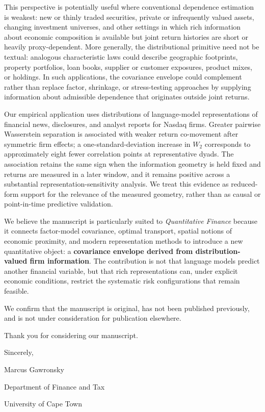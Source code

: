 \documentclass[11pt]{article}
\begin{document}
This perspective is potentially useful where conventional dependence
estimation is weakest: new or thinly traded securities, private or
infrequently valued assets, changing investment universes, and other settings
in which rich information about economic composition is available but joint
return histories are short or heavily proxy-dependent.
More generally, the distributional primitive need not be textual: analogous
characteristic laws could describe geographic footprints, property
portfolios, loan books, supplier or customer exposures, product mixes, or holdings.
In such applications, the covariance envelope could complement rather than
replace factor, shrinkage, or stress-testing approaches by supplying
information about admissible dependence that originates outside joint returns.

Our empirical application uses distributions of language-model
representations of financial news, disclosures, and analyst reports for Nasdaq firms.
Greater pairwise Wasserstein separation is associated with weaker return
co-movement after symmetric firm effects; a one-standard-deviation increase
in $W_2$ corresponds to approximately eight fewer correlation points at
representative dyads.
The association retains the same sign when the information geometry is held
fixed and returns are measured in a later window, and it remains positive
across a substantial representation-sensitivity analysis.
We treat this evidence as reduced-form support for the relevance of the
measured geometry, rather than as causal or point-in-time predictive validation.

We believe the manuscript is particularly suited to \textit{Quantitative
Finance} because it connects factor-model covariance, optimal transport,
spatial notions of economic proximity, and modern representation methods to
introduce a new quantitative object: a \textbf{covariance envelope derived
from distribution-valued firm information}.
The contribution is not that language models predict another financial
variable, but that rich representations can, under explicit economic
conditions, restrict the systematic risk configurations that remain feasible.

We confirm that the manuscript is original, has not been published
previously, and is not under consideration for publication elsewhere.

Thank you for considering our manuscript.

\begingroup
\setlength{\parskip}{0pt}
Sincerely,\par
\smallskip
Marcus Gawronsky\par
Department of Finance and Tax\par
University of Cape Town
\endgroup
\end{document}
